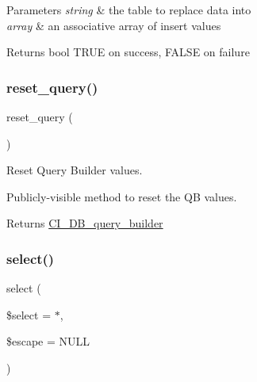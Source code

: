 \begin{DoxyParams}{Parameters}
{\em string} & the table to replace data into \\
\hline
{\em array} & an associative array of insert values \\
\hline
\end{DoxyParams}
\begin{DoxyReturn}{Returns}
bool T\+R\+UE on success, F\+A\+L\+SE on failure 
\end{DoxyReturn}
\mbox{\label{class_c_i___d_b__query__builder_a66636a017a1115d983424cdfca677ddf}} 
\subsubsection{\texorpdfstring{reset\+\_\+query()}{reset\_query()}}
{\footnotesize\ttfamily reset\+\_\+query (\begin{DoxyParamCaption}{ }\end{DoxyParamCaption})}

Reset Query Builder values.

Publicly-\/visible method to reset the QB values.

\begin{DoxyReturn}{Returns}
\mbox{\hyperlink{class_c_i___d_b__query__builder}{C\+I\+\_\+\+D\+B\+\_\+query\+\_\+builder}} 
\end{DoxyReturn}
\mbox{\label{class_c_i___d_b__query__builder_a406a7ea81e717e56496f61baf3e03f44}} 
\subsubsection{\texorpdfstring{select()}{select()}}
{\footnotesize\ttfamily select (\begin{DoxyParamCaption}\item[{}]{\$select = {\ttfamily \textquotesingle{}$\ast$\textquotesingle{}},  }\item[{}]{\$escape = {\ttfamily NULL} }\end{DoxyParamCaption})}

